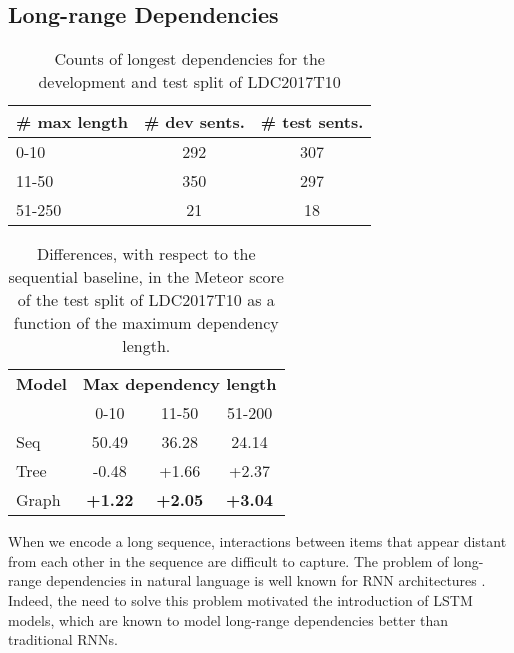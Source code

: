 \documentclass[11pt,a4paper]{article}
\begin{document}
\subsection{Long-range Dependencies}
\label{sec:deps}
\begin{table}
\centering
\begin{tabular}{lcc}
\toprule
\textbf{\# max length} & \textbf{\# dev sents.} & \textbf{\# test sents.}\\
\midrule
0-10 & 292 & 307\\
11-50 & 350 & 297\\
51-250 & 21 & 18\\
\bottomrule
\end{tabular}
\caption{Counts of longest dependencies for the development and test split of LDC2017T10}
\label{tab:stats_dependencies}
\end{table}
% 
\begin{table}
\centering
\begin{tabular}{lccc}
\toprule
\textbf{Model} & \multicolumn{3}{c}{\textbf{Max dependency length}}\\
 & 0-10 & 11-50 & 51-200\\
\midrule
{\sc Seq} & 50.49 & 36.28 & 24.14 \\
{\sc Tree} & -0.48 & +1.66 & +2.37 \\ 
{\sc Graph} & \textbf{+1.22} & \textbf{+2.05} & \textbf{+3.04} \\
\bottomrule
\end{tabular}
\caption{Differences, with respect to the sequential baseline, in the Meteor score of the test split of LDC2017T10 as a function of the maximum dependency length.}
\label{tab:diff_deps}
\end{table}

When we encode a long sequence, interactions between items that appear distant from each other in the sequence are difficult to capture. The problem of long-range dependencies in natural language is well known for RNN architectures \cite{bengio1994learning}. Indeed, the need to solve this problem motivated the introduction of LSTM models, which are known to model long-range dependencies better than traditional RNNs.
\end{document}
